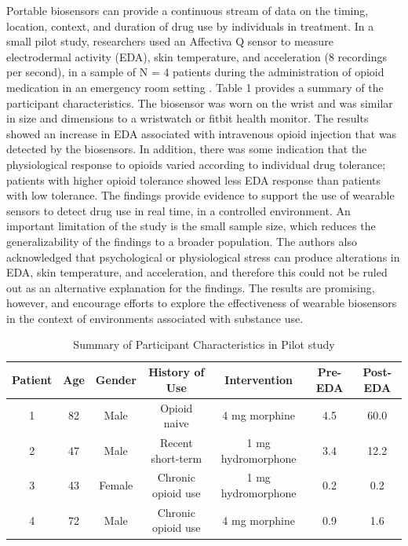 \documentclass[sigconf]{acmart}
\begin{document}
Portable biosensors can provide a continuous stream of data on the timing, 
location, context, and duration of drug use by individuals in treatment. 
In a small pilot study, researchers used an Affectiva Q sensor to measure 
electrodermal activity (EDA), skin temperature, and acceleration (8 recordings 
per second), in a sample of N = 4 patients during the administration of opioid 
medication in an emergency room setting \cite{carreiro15}. Table 1 provides a 
summary of the participant characteristics. The biosensor was worn on the 
wrist and was similar in size and dimensions to a wristwatch or fitbit health
monitor. The results showed an increase in EDA associated with intravenous 
opioid injection that was detected by the biosensors. In addition, there was 
some indication that the physiological response to opioids varied according 
to individual drug tolerance; patients with higher opioid tolerance showed
less EDA response than patients with low tolerance. The findings provide 
evidence to support the use of wearable sensors to detect drug use in real 
time, in a controlled environment. An important limitation of the study is 
the small sample size, which reduces the generalizability of the findings to 
a broader population. The authors also acknowledged that psychological or 
physiological stress can produce alterations in EDA, skin temperature, and 
acceleration, and therefore this could not be ruled out as an alternative 
explanation for the findings. The results are promising, however, and 
encourage efforts to explore the effectiveness of wearable biosensors 
in the context of environments associated with substance use.

\begin{table}
  \caption{Summary of Participant Characteristics in Pilot study \cite{carreiro15}}
  \label{tab:freq}
  \begin{tabular}{ccccccc}
    \toprule
     Patient& Age& Gender& History of Use& Intervention& Pre-EDA& Post-EDA \\
    \midrule
    1& 82& Male& Opioid naive& 4 mg morphine& 4.5& 60.0 \\
    2& 47& Male& Recent short-term& 1 mg hydromorphone& 3.4& 12.2 \\
    3& 43& Female& Chronic opioid use& 1 mg hydromorphone& 0.2& 0.2 \\
    4& 72& Male& Chronic opioid use& 4 mg morphine& 0.9& 1.6 \\
    \bottomrule
  \end{tabular}
\end{table}
\end{document}
